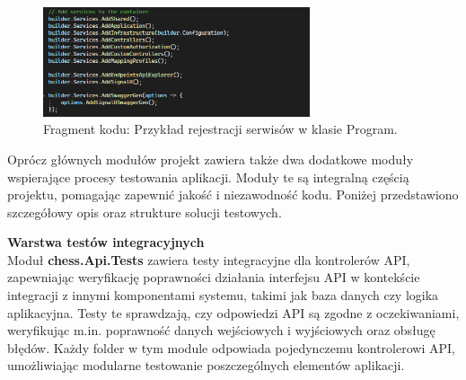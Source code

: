 \documentclass[12pt,a4paper]{article}
\begin{document}
\vspace{0.5cm}
\begin{figure}[h!]
    \centering
    \includegraphics[width=0.7\textwidth]{images/ex_add_services.png}
    \caption{Fragment kodu: Przykład rejestracji serwisów w klasie Program.}
\end{figure}
\vspace{0.5cm}

\noindent 
Oprócz głównych modułów projekt zawiera także dwa dodatkowe moduły wspierające procesy testowania aplikacji. Moduły te są integralną częścią projektu, pomagając zapewnić jakość i niezawodność kodu. Poniżej przedstawiono szczegółowy opis oraz strukture solucji testowych.

\newpage

\noindent \textbf{Warstwa testów integracyjnych}\\
Moduł \textbf{chess.Api.Tests} zawiera testy integracyjne dla kontrolerów API, zapewniając weryfikację poprawności działania interfejsu API w kontekście integracji z innymi komponentami systemu, takimi jak baza danych czy logika aplikacyjna. Testy te sprawdzają, czy odpowiedzi API są zgodne z oczekiwaniami, weryfikując m.in. poprawność danych wejściowych i wyjściowych oraz obsługę błędów. Każdy folder w tym module odpowiada pojedynczemu kontrolerowi API, umożliwiając modularne testowanie poszczególnych elementów aplikacji.
\end{document}
